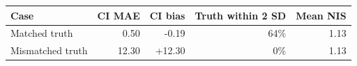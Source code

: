 \begin{tabular}{lrrrr}
\toprule
Case & CI MAE & CI bias & Truth within 2 SD & Mean NIS\\
\midrule
Matched truth & 0.50 & -0.19 & 64\% & 1.13\\
Mismatched truth & 12.30 & +12.30 & 0\% & 1.13\\
\bottomrule
\end{tabular}
